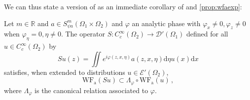 \documentclass[
	fontsize=11pt, 
	twoside=false, 
	abstract=true, 
	a4paper,
]{scrartcl}
\newcommand{\sem}{\setminus\{0\}}
\newcommand{\RR}{\mathbb{R}}
\newcommand{\dd}{\mathrm{d}}
\newcommand{\abs}[1]{\left\lvert#1\right\rvert}
\newcommand{\td}[1]{\tilde{#1}}
\newcommand{\wf}{\mathrm{WF}_{\mathrm{a}}}
\begin{document}


We can thus state a version of \cite[Thm.~18.7.2]{MR4436039} as an immediate corollary of \cite[Thm.~8.5.5]{hoermander1} and \cref{prop:wfaexp}:
\begin{corollary}\label{cor:simpleWfdirec}
	Let $m\in\RR$ and $a\in S^m_{\psi a}(\Omega_1\times\Omega_2)$ and $\varphi$ an analytic phase with $\varphi_x \neq 0, \varphi_z \neq 0$ when $\varphi_\eta = 0,\eta\neq 0$. The operator $S \colon C_c^\infty(\Omega_2) \to \mathcal{D}'(\Omega_1)$ defined for all $u\in C_c^\infty(\Omega_2)$ by 
	\[
		Su(z) = \iint e^{i\varphi(z,x,\eta)}a(z,x,\eta)\dd\eta u(x) \dd x
	\]
	satisfies, when extended to distributions $u\in \mathcal{E}'(\Omega_2)$,
	\[
		\wf(Su) \subset \Lambda_\varphi \circ \wf(u)\,,
	\]
	where $\Lambda_\varphi$ is the canonical relation associated to $\varphi$.
\end{corollary}
\end{document}
